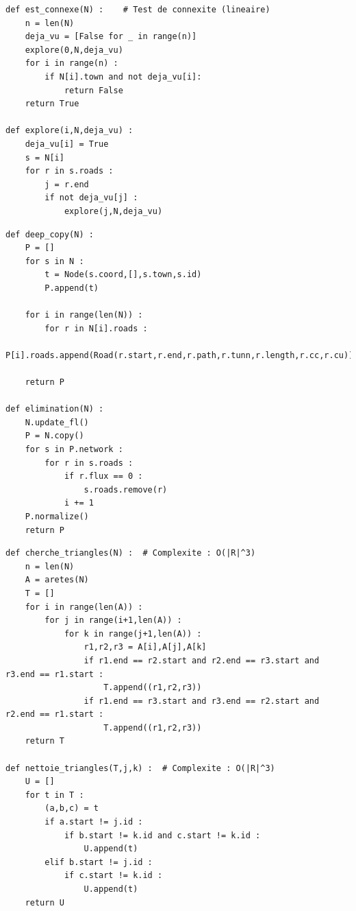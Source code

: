\documentclass{beamer}[11pt]
\begin{document}
		\begin{frame}[containsverbatim]
\begin{lstlisting}
def est_connexe(N) :	# Test de connexite (lineaire)
    n = len(N)
    deja_vu = [False for _ in range(n)]
    explore(0,N,deja_vu)
    for i in range(n) :
        if N[i].town and not deja_vu[i]:
            return False
    return True

def explore(i,N,deja_vu) :
    deja_vu[i] = True
    s = N[i]
    for r in s.roads :
        j = r.end
        if not deja_vu[j] :
            explore(j,N,deja_vu)
\end{lstlisting}
		\end{frame}

		\begin{frame}[containsverbatim]
\begin{lstlisting}
def deep_copy(N) :
    P = []
    for s in N :
        t = Node(s.coord,[],s.town,s.id)
        P.append(t)

    for i in range(len(N)) :
        for r in N[i].roads :
            P[i].roads.append(Road(r.start,r.end,r.path,r.tunn,r.length,r.cc,r.cu))

    return P

def elimination(N) :
    N.update_fl()
    P = N.copy()
    for s in P.network :
        for r in s.roads :
            if r.flux == 0 :
                s.roads.remove(r)
            i += 1
    P.normalize()
    return P
\end{lstlisting}
		\end{frame}

		\begin{frame}[containsverbatim]
\begin{lstlisting}
def cherche_triangles(N) :	# Complexite : O(|R|^3)
    n = len(N)
    A = aretes(N)
    T = []
    for i in range(len(A)) :
        for j in range(i+1,len(A)) :
            for k in range(j+1,len(A)) :
                r1,r2,r3 = A[i],A[j],A[k]
                if r1.end == r2.start and r2.end == r3.start and r3.end == r1.start :
                    T.append((r1,r2,r3))
                if r1.end == r3.start and r3.end == r2.start and r2.end == r1.start :
                    T.append((r1,r2,r3))
    return T

def nettoie_triangles(T,j,k) :	# Complexite : O(|R|^3)
    U = []
    for t in T :
        (a,b,c) = t
        if a.start != j.id :
            if b.start != k.id and c.start != k.id :
                U.append(t)
        elif b.start != j.id :
            if c.start != k.id :
                U.append(t)
    return U
\end{lstlisting}
		\end{frame}
\end{document}
